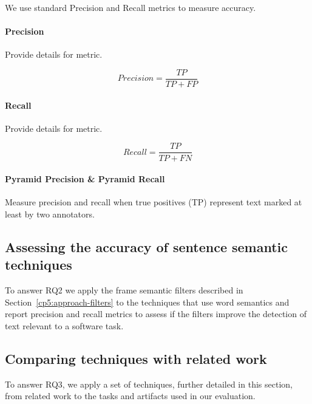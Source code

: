 We use standard Precision and Recall metrics to measure accuracy.





\paragraph{\textbf{Precision}}

Provide details for metric.



\begin{equation}
\label{eq:cp5:precision}    
    Precision = \frac{TP}{TP + FP}
\end{equation}


\paragraph{\textbf{Recall}}

Provide details for metric.


\begin{equation}
\label{eq:cp5:recall}        
    Recall = \frac{TP}{TP + FN}
\end{equation}



\paragraph{\textbf{Pyramid Precision \& Pyramid Recall}} 

Measure precision and recall when true positives (TP) represent text marked at least by two annotators.


\subsection{Assessing the accuracy of sentence semantic techniques}


To answer RQ2 we apply the frame semantic filters described in Section~\ref{cp5:approach-filters} to the techniques that use word semantics and report precision and recall metrics to assess if the filters improve the detection of text relevant to a software task.




\subsection{Comparing techniques with related work}


To answer RQ3, we apply a set of techniques, further detailed in this section, from related work to the tasks and artifacts used in our evaluation. 


